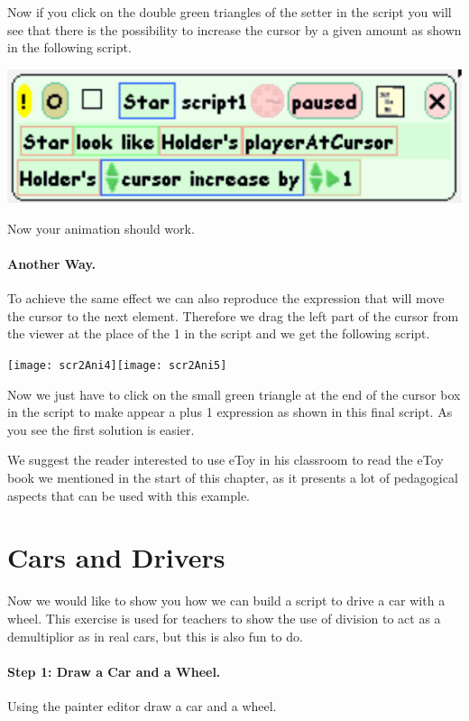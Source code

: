 Now if you click on the double green triangles of the setter in the script you will see that there is the possibility to increase the cursor by a given amount as shown in the following script. 
\begin{center}\includegraphics[]{scr2Ani3bis}\end{center}

Now your animation should work. 

\paragraph{Another Way.}
To achieve the same effect we can also reproduce the expression  that will move the cursor to the next element. Therefore we drag the left part of the cursor from the viewer at the place of the 1 in the script and we get the following script. 
\begin{center}\texttt{[image: scr2Ani4]}\texttt{[image: scr2Ani5]}\end{center}
Now we just have to click on the small green triangle at the end of the cursor box in the script to make appear a plus 1 expression 
as shown in this final script. As you see the first solution is easier.

We suggest the reader interested to use eToy in his classroom to read the eToy book we mentioned in the start of this chapter, as it presents a lot of pedagogical aspects that can be used with this example. 


\section{Cars and  Drivers}

Now we would like to show you how we can build a script to drive a car with a wheel. This exercise is used for teachers to show the use of division to act as a demultiplior as in real cars, but this is also fun to do.

\paragraph{Step 1: Draw a Car and a Wheel.} Using the painter editor draw a car and a wheel. 


